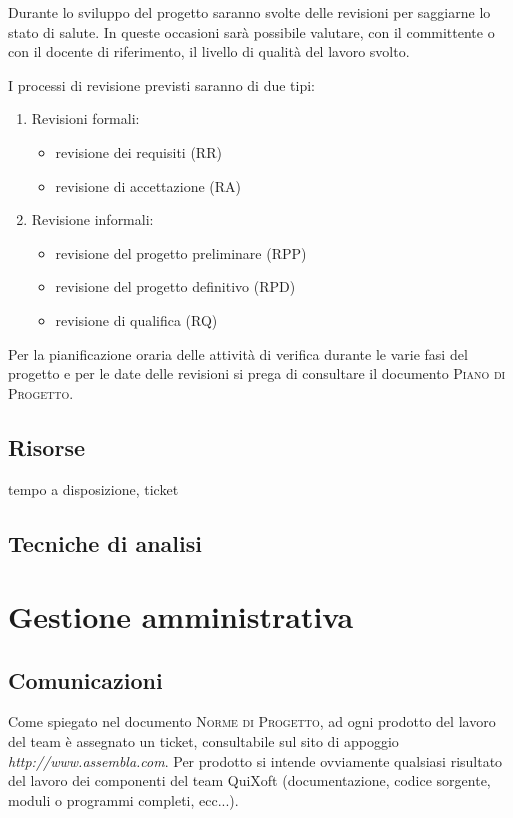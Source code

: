 \documentclass[11pt,a4paper]{article}
\begin{document}
Durante lo sviluppo del progetto saranno svolte delle revisioni per saggiarne lo stato di salute. In queste occasioni sarà possibile valutare, con il committente o con il docente di riferimento, il livello di qualità del lavoro svolto.

I processi di revisione previsti saranno di due tipi:
\begin{enumerate}
 	\item Revisioni formali:
	\begin{itemize}
		\item revisione dei requisiti (RR)
		\item revisione di accettazione (RA)
	\end{itemize}
 	\item Revisione informali:
	\begin{itemize}
		\item revisione del progetto preliminare (RPP)
		\item revisione del progetto definitivo (RPD)
		\item revisione di qualifica (RQ)
	\end{itemize}
\end{enumerate}

Per la pianificazione oraria delle attività di verifica durante le varie fasi del progetto e per le date delle revisioni si prega di consultare il documento \textsc{Piano di Progetto}.
\subsection{Risorse} tempo a disposizione, ticket
\subsection{Tecniche di analisi}
\section{Gestione amministrativa}
\subsection{Comunicazioni}
Come spiegato nel documento \textsc{Norme di Progetto}, ad ogni prodotto del lavoro del team è assegnato un ticket, consultabile sul sito di appoggio \textit{http://www.assembla.com}. Per prodotto si intende ovviamente qualsiasi risultato del lavoro dei componenti del team QuiXoft (documentazione, codice sorgente, moduli o programmi completi, ecc...).
\end{document}
